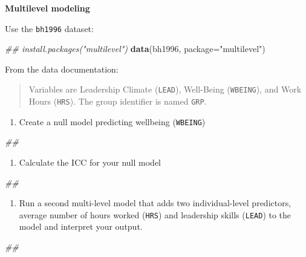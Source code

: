 \documentclass[]{book}
\newenvironment{Shaded}{\begin{snugshade}}{\end{snugshade}}
\newcommand{\CommentTok}[1]{\textcolor[rgb]{0.56,0.35,0.01}{\textit{#1}}}
\newcommand{\DataTypeTok}[1]{\textcolor[rgb]{0.13,0.29,0.53}{#1}}
\newcommand{\KeywordTok}[1]{\textcolor[rgb]{0.13,0.29,0.53}{\textbf{#1}}}
\newcommand{\NormalTok}[1]{#1}
\newcommand{\StringTok}[1]{\textcolor[rgb]{0.31,0.60,0.02}{#1}}
\providecommand{\tightlist}{%
  \setlength{\itemsep}{0pt}\setlength{\parskip}{0pt}}
\begin{document}
\textbf{Multilevel modeling}

Use the \texttt{bh1996} dataset:

\begin{Shaded}
\begin{Highlighting}[]
\CommentTok{## install.packages("multilevel")}
\KeywordTok{data}\NormalTok{(bh1996, }\DataTypeTok{package=}\StringTok{"multilevel"}\NormalTok{)}
\end{Highlighting}
\end{Shaded}

From the data documentation:

\begin{quote}
Variables are Leadership Climate (\texttt{LEAD}), Well-Being (\texttt{WBEING}), and Work Hours (\texttt{HRS}). The group identifier is named \texttt{GRP}.
\end{quote}

\begin{enumerate}
\def\labelenumi{\arabic{enumi}.}
\tightlist
\item
  Create a null model predicting wellbeing (\texttt{WBEING})
\end{enumerate}

\begin{Shaded}
\begin{Highlighting}[]
\CommentTok{## }
\end{Highlighting}
\end{Shaded}

\begin{enumerate}
\def\labelenumi{\arabic{enumi}.}
\setcounter{enumi}{1}
\tightlist
\item
  Calculate the ICC for your null model
\end{enumerate}

\begin{Shaded}
\begin{Highlighting}[]
\CommentTok{## }
\end{Highlighting}
\end{Shaded}

\begin{enumerate}
\def\labelenumi{\arabic{enumi}.}
\setcounter{enumi}{2}
\tightlist
\item
  Run a second multi-level model that adds two individual-level predictors, average number of hours worked (\texttt{HRS}) and leadership skills (\texttt{LEAD}) to the model and interpret your output.
\end{enumerate}

\begin{Shaded}
\begin{Highlighting}[]
\CommentTok{## }
\end{Highlighting}
\end{Shaded}
\end{document}
